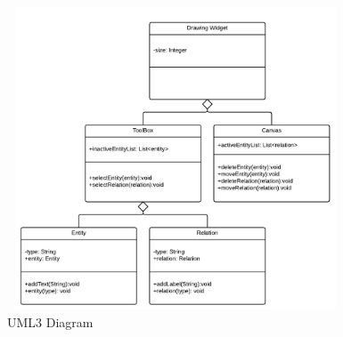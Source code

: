    \begin{figure}[H]
            \centerline{\includegraphics[height=9cm, width=10cm]{UML_3.jpeg}}
            \caption{UML3 Diagram}
    \end{figure}

















